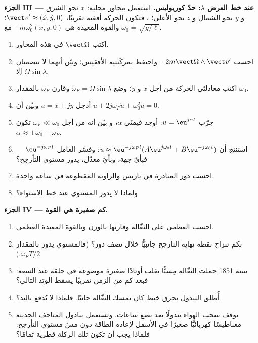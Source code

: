 \begin{problem}
\medskip
\noindent\textbf{الجزء III --- عند خط العرض $\lambda$: حدّ كوريوليس.}
استعمل محاور محلية: $x$ نحو الشرق و $y$ نحو الشمال و $z$ نحو الأعلى؛ ، فتكون
الحركة أفقية تقريبًا، $\vect v' \approx (\dot x, \dot y, 0)$؛ والقوة
المعيدة هي $-m\omega_0^2(x, y, 0)$ مع $\omega_0 = \sqrt{g/\ell}$.
\begin{enumerate}[resume]
  \item اكتب $\vect\Omega$ في هذه المحاور.
  \item احسب $-2m\vect\Omega\wedge\vect v'$ واحتفظ بمركّبتيه
        الأفقيتين؛ وبيّن أنهما لا تتضمنان إلا $\Omega\sin\lambda$.
  \item اكتب معادلتَي الحركة من أجل $x$ و $y$؛ وضع
        $\omega_F = \Omega\sin\lambda$ وقارن $\omega_F$ بالمقدار $\omega_0$.
  \item أدخِل $u = x + jy$ وبيّن أن $\ddot u + 2j\omega_F\dot u +
        \omega_0^2u = 0$.
  \item جرّب $u = \eu^{j\alpha t}$: أوجد قيمتَي $\alpha$، و
        بيّن أنه من أجل $\omega_F \ll \omega_0$ تكون $\alpha \approx \pm\omega_0
        - \omega_F$.
  \item استنتج أن $u \approx \eu^{-j\omega_Ft}(A\eu^{j\omega_0t} + B\eu^{-j\omega_0t})$:
        وفسّر العامل $\eu^{-j\omega_Ft}$ --- فبأيّ جهة، وبأيّ
        معدّل، يدور مستوي التأرجح؟
  \item احسب دور المبادرة في باريس والزاوية المقطوعة في
        ساعة واحدة.
  \item ولماذا لا يدور المستوي عند خط الاستواء؟
\end{enumerate}

\medskip
\noindent\textbf{الجزء IV --- كم صغيرة هي القوة.}
\begin{enumerate}[resume]
  \item احسب  العظمى على الثقّالة وقارنها
        بالوزن وبالقوة المعيدة العظمى.
  \item بكم تنزاح نقطة نهاية التأرجح جانبيًّا خلال
        نصف دور؟ (فالمستوي يدور بالمقدار $\omega_FT/2$.)
  \item سنة 1851 حملت الثقّالة مِسنًّا يقلب أوتادًا صغيرة
        موضوعة في حلقة عند السعة: فبعد كم من الزمن تقريبًا يسقط
        الوتد التالي؟
  \item أُطلق البندول بحرق خيط كان يمسك الثقّالة
        جانبًا. فلماذا لا يُدفع باليد؟
  \item يوقف سحب الهواء بندولًا بعد بضع ساعات. وتستعمل بنادول المتاحف
        الحديثة مغناطيسًا كهربائيًّا صغيرًا في الأسفل لإعادة
        الطاقة دون مسّ مستوي التأرجح: فلماذا يجب أن تكون تلك الركلة
        قطرية تمامًا؟
\end{enumerate}


\end{problem}
